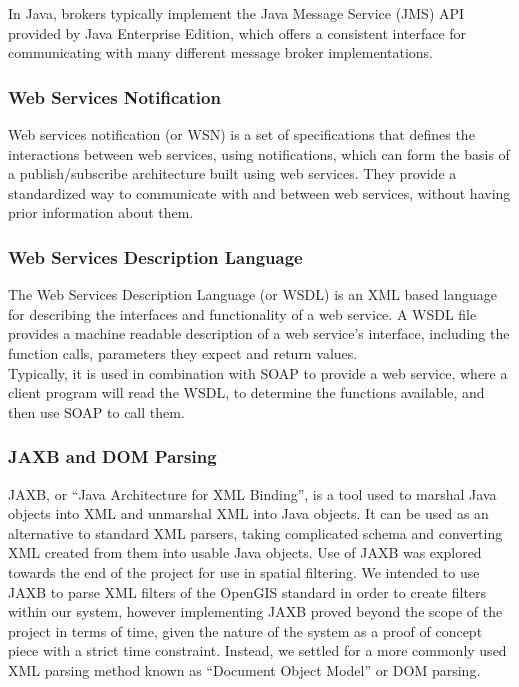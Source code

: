 \documentclass[a4paper, 12pt]{article}
\begin{document}
In Java, brokers typically implement the Java Message Service (JMS) API provided by Java Enterprise Edition, which offers a consistent interface for communicating with many different message broker implementations.

\subsubsection{Web Services Notification}

Web services notification (or WSN) is a set of specifications that defines the interactions between web services, using notifications, which can form the basis of a publish/subscribe architecture built using web services. They provide a standardized way to communicate with and between web services, without having prior information about them.

\subsubsection{Web Services Description Language}

The Web Services Description Language (or WSDL) is an XML based language for describing the interfaces and functionality of a web service. A WSDL file provides a machine readable description of a web service's interface, including the function calls, parameters they expect and return values.\\
Typically, it is used in combination with SOAP to provide a web service, where a client program will read the WSDL, to determine the functions available, and then use SOAP to call them.

\subsubsection{JAXB and DOM Parsing}

JAXB, or ``Java Architecture for XML Binding'', is a tool used to marshal Java objects into XML and unmarshal XML into Java objects. It can be used as an alternative to standard XML parsers, taking complicated schema and converting XML created from them into usable Java objects. Use of JAXB was explored towards the end of the project for use in spatial filtering. We intended to use JAXB to parse XML filters of the OpenGIS standard in order to create filters within our system, however implementing JAXB proved beyond the scope of the project in terms of time, given the nature of the system as a proof of concept piece with a strict time constraint. Instead, we settled for a more commonly used XML parsing method known as ``Document Object Model'' or DOM parsing.
\end{document}
